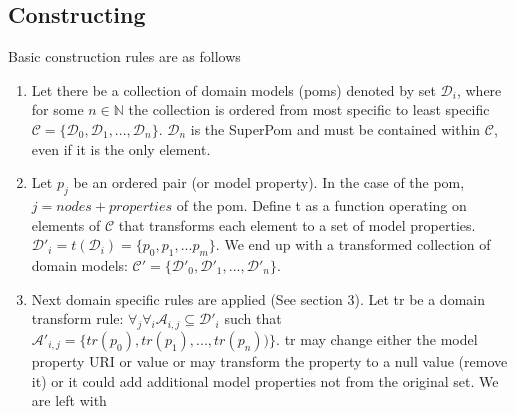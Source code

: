 \documentclass[12pt]{amsart}
\begin{document}
\subsection{Constructing}
Basic construction rules are as follows
\begin{enumerate}
\item Let there be a collection of domain models (poms) denoted by set \begin{math}\mathcal{D}_{i}\end{math}, where for some \begin{math} n \in \mathbb{N} \end{math} the collection is ordered from most specific to least specific \begin{math}\mathcal{C} = \{\mathcal{D}_{0}, \mathcal{D}_{1},...,\mathcal{D}_{n} \} \end{math}.  \begin{math}\mathcal{D}_{n}\end{math} is the SuperPom and must be contained within \begin{math}\mathcal{C}\end{math}, even if it is the only element.
\item Let \begin{math}p_j\end{math} be an ordered pair (or model property). In the case of the pom, \begin{math}j=nodes + properties\end{math} of the pom. Define t as a function operating on elements of \begin{math}\mathcal{C}\end{math} that transforms each element to a set of model properties.  \begin{math}\mathcal{D}'_{i}=t(\mathcal{D}_{i})=\{p_0,p_1,...p_m\}\end{math}. We end up with a transformed collection of domain models: \begin{math}\mathcal{C'} = \{\mathcal{D'}_{0}, \mathcal{D'}_{1},...,\mathcal{D'}_{n} \} \end{math}.  
\item Next domain specific rules are applied (See section 3). Let tr be a domain transform rule: \begin{math}
\forall_j \forall_i \mathcal{A}_{i,j}  \subseteq \mathcal{D'}_{i} \end{math} such that \begin{math}  \mathcal{A'}_{i,j} = \{tr(p_0), tr(p_1),...,tr(p_n))\}. \end{math} tr may change either the model property URI or value or may transform the property to a null value (remove it) or it could add additional model properties not from the original set.  We are left with \begin{math}

\end{math}
\end{enumerate}
\end{document}
